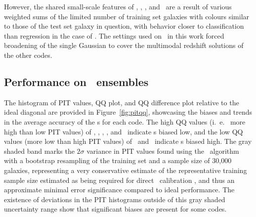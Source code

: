 However, the shared small-scale features of \annz, \metaphor, \cmnn, and \skynet\ are a result of various weighted sums of the limited number of training set galaxies with colours similar to those of the test set galaxy in question, with behavior closer to classification than regression in the case of \annz.
The settings used on \gpz\ in this work forced broadening of the single Gaussian to cover the multimodal redshift solutions of the other codes.

\subsection{Performance on \pzpdf\ ensembles}
\label{sec:pitqq}

The histogram of PIT values, QQ plot, and QQ difference plot relative to the ideal diagonal are provided in Figure~\ref{fig:pitqq}, showcasing the biases and trends in the average accuracy of the \pzpdf s for each code.
The high QQ values (i.~e.~ more high than low PIT values) of \bpz, \cmnn, \delight, \eazy, and \gpz\ indicate \pzpdf s biased low, and the low QQ values (more low than high PIT values) of \skynet\ and \tpz\ indicate \pzpdf s biased high.
The gray shaded band marks the $2\sigma$ variance in PIT values found using the \trainz\ algorithm with a bootstrap resampling of the training set and a sample size of 30,000 galaxies, representing a very conservative estimate of the representative training sample size estimated as being required for direct \pz\ calibration \citep{Newman:2015}, and thus an approximate minimal error significance compared to ideal performance.
The existence of deviations in the PIT histograms outside of this gray shaded uncertainty range show that significant biases are present for some codes.

